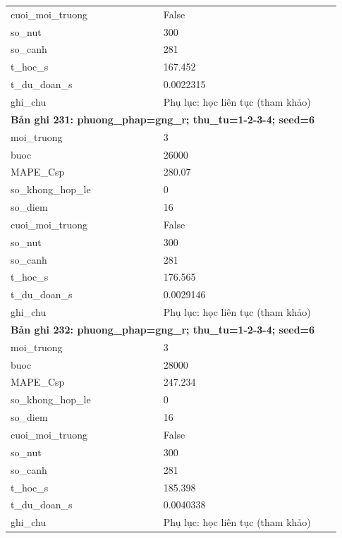 \begin{longtable}{p{0.43\linewidth}p{0.50\linewidth}}
cuoi\_\allowbreak moi\_\allowbreak truong & False \\
so\_\allowbreak nut & 300 \\
so\_\allowbreak canh & 281 \\
t\_\allowbreak hoc\_\allowbreak s & 167.452 \\
t\_\allowbreak du\_\allowbreak doan\_\allowbreak s & 0.0022315 \\
ghi\_\allowbreak chu & Phụ lục: học liên tục (tham khảo) \\
\midrule
\multicolumn{2}{p{0.95\linewidth}}{\textbf{Bản ghi 231: phuong\_phap=gng\_r; thu\_tu=1-2-3-4; seed=6}} \\
moi\_\allowbreak truong & 3 \\
buoc & 26000 \\
MAPE\_\allowbreak Csp & 280.07 \\
so\_\allowbreak khong\_\allowbreak hop\_\allowbreak le & 0 \\
so\_\allowbreak diem & 16 \\
cuoi\_\allowbreak moi\_\allowbreak truong & False \\
so\_\allowbreak nut & 300 \\
so\_\allowbreak canh & 281 \\
t\_\allowbreak hoc\_\allowbreak s & 176.565 \\
t\_\allowbreak du\_\allowbreak doan\_\allowbreak s & 0.0029146 \\
ghi\_\allowbreak chu & Phụ lục: học liên tục (tham khảo) \\
\midrule
\multicolumn{2}{p{0.95\linewidth}}{\textbf{Bản ghi 232: phuong\_phap=gng\_r; thu\_tu=1-2-3-4; seed=6}} \\
moi\_\allowbreak truong & 3 \\
buoc & 28000 \\
MAPE\_\allowbreak Csp & 247.234 \\
so\_\allowbreak khong\_\allowbreak hop\_\allowbreak le & 0 \\
so\_\allowbreak diem & 16 \\
cuoi\_\allowbreak moi\_\allowbreak truong & False \\
so\_\allowbreak nut & 300 \\
so\_\allowbreak canh & 281 \\
t\_\allowbreak hoc\_\allowbreak s & 185.398 \\
t\_\allowbreak du\_\allowbreak doan\_\allowbreak s & 0.0040338 \\
ghi\_\allowbreak chu & Phụ lục: học liên tục (tham khảo) \\

\end{longtable}
